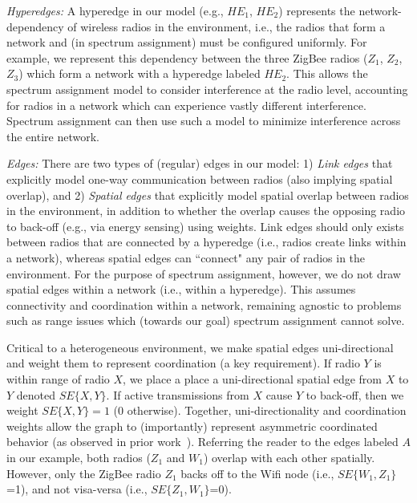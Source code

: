 \smallskip

\emph{Hyperedges:} A hyperedge in our model (e.g., $HE_1$, $HE_2$) represents the network-dependency of wireless radios in the environment, i.e., the radios that form a network and (in spectrum assignment) must be configured uniformly.  For example, we represent this dependency between the three ZigBee radios ($Z_1$, $Z_2$, $Z_3$) which form a network with a hyperedge labeled $HE_2$.    This allows the spectrum assignment model to consider interference at the radio level, accounting for radios in a network which can experience vastly different interference.  Spectrum assignment can then use such a model to minimize interference across the entire network.



\smallskip
\emph{Edges:}  There are two types of (regular) edges in our model:  1) \emph{Link edges} that explicitly model one-way communication between radios (also implying spatial overlap), and 2) \emph{Spatial edges} that explicitly model spatial overlap between radios in the environment, in addition to whether the overlap causes the opposing radio to back-off (e.g., via energy sensing) using weights.  Link edges should only exists between radios that are connected by a hyperedge (i.e., radios create links within a network),  whereas spatial edges can ``connect" any pair of radios in the environment.   For the purpose of spectrum assignment, however, we do not draw spatial edges within a network (i.e., within a hyperedge). This assumes connectivity and coordination within a network, remaining agnostic to problems such as range issues which (towards our goal) spectrum assignment cannot solve.  


Critical to a heterogeneous environment, we make spatial edges uni-directional and weight them to represent coordination (a key requirement).  If radio $Y$ is within range of radio $X$, we place a place a uni-directional spatial edge from $X$ to $Y$ denoted $SE\{X,Y\}$.  If active transmissions from $X$ cause $Y$ to back-off, then we weight $SE\{X,Y\}=1$ (0 otherwise).  Together, uni-directionality and coordination weights allow the graph to (importantly) represent asymmetric coordinated behavior (as observed in prior work~\cite{buzz buzz}).  Referring the reader to the edges labeled $A$ in our example, both radios ($Z_1$ and $W_1$) overlap with each other spatially.  However, only the ZigBee radio $Z_1$ backs off to the Wifi node (i.e., $SE\{W_1,Z_1\}$=1), and not visa-versa (i.e., $SE\{Z_1, W_1\}$=0).

